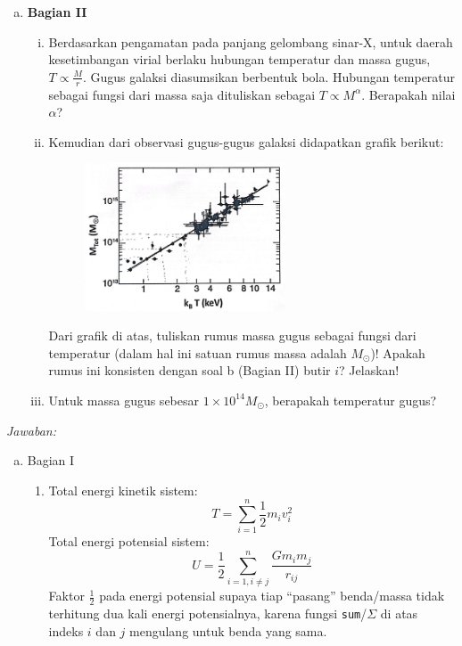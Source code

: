 \documentclass[11pt,fleqn]{exam}
\begin{document}
\begin{questions}
\begin{enumerate}[a.]
    \item \textbf{Bagian II}
    \begin{enumerate}[i.]
        \item Berdasarkan pengamatan pada panjang gelombang sinar-X, untuk daerah kesetimbangan virial berlaku hubungan temperatur dan massa gugus, $T \propto \frac{M}{r}$. Gugus galaksi diasumsikan berbentuk bola. Hubungan temperatur sebagai fungsi dari massa saja dituliskan sebagai $T \propto M^{\alpha}$. Berapakah nilai $\alpha$?

        \newpage
        \item Kemudian dari observasi gugus-gugus galaksi didapatkan grafik berikut:
        
        \begin{figure}[!ht]
            \centering
            \includegraphics[width=0.6\textwidth]{osn_soal5.jpg}
        \end{figure}
        
        Dari grafik di atas, tuliskan rumus massa gugus sebagai fungsi dari temperatur (dalam hal ini satuan rumus massa adalah $M_\odot$)! Apakah rumus ini konsisten dengan soal b (Bagian II) butir $i$? Jelaskan!

        \item Untuk massa gugus sebesar $1 \times 10^{14} M_\odot$, berapakah temperatur gugus?
    \end{enumerate}
\end{enumerate}


\newpage
\textit{Jawaban:}

\begin{enumerate}[a.]
    \item Bagian I
    \begin{enumerate}[i]
        \item Total energi kinetik sistem:
        $$T = \sum_{i=1}^n \frac{1}{2}  m_i v_i^2$$
        Total energi potensial sistem:
        $$U = \frac{1}{2} \sum_{i=1, i \neq j}^n \frac{G m_i m_j}{r_{ij}}$$
        Faktor $\frac{1}{2}$ pada energi potensial supaya tiap ``pasang'' benda/massa tidak terhitung dua kali energi potensialnya, karena  fungsi \texttt{sum}/$\Sigma$ di atas indeks $i$ dan $j$ mengulang untuk benda yang sama.
        

\end{enumerate}
\end{enumerate}
\end{questions}
\end{document}
